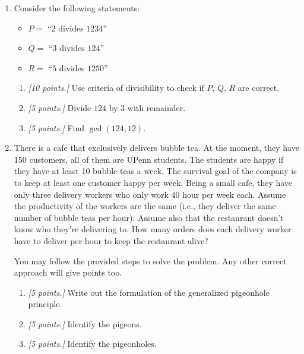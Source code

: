 \documentclass[12pt]{amsart}
\begin{document}
\begin{enumerate}[label=\arabic*.,itemsep=10pt, leftmargin=*]
    \item 
        Consider the following statements:
        \begin{itemize}
            \item $P=$ ``$2$ divides $1234$''
            \item $Q =$ ``$3$ divides $124$''
            \item $R=$ ``$5$ divides $1250$''
        \end{itemize}
        \begin{enumerate}
        \item
        \textit{[10 points.]}
        Use criteria of divisibility to check if $P$, $Q$, $R$ are correct.
        \item
        \textit{[5 points.]}
        Divide $124$ by $3$ with remainder.
        \item
        \textit{[5 points.]}
        Find $\gcd(124,12)$.
        \end{enumerate}
    \item 
        There is a cafe that exclusively delivers bubble tea.
        At the moment, they have 150 customers, all of them are UPenn students.
        The students are happy if they have at least 10 bubble teas a week.
        The survival goal of the company is to keep at least one customer happy per week.
        Being a small cafe, they have only three delivery workers who only work 40 hour per week each.
        Assume the productivity of the workers are the same (i.e., they deliver the same number of bubble teas per hour).
        Assume also that the restaurant doesn't know who they're delivering to.
        How many orders does each delivery worker have to deliver per hour to keep the restaurant alive? 
        
        You may follow the provided steps to solve the problem. Any other correct approach will give points too.
        
        \begin{enumerate}
            \item
        \textit{[5 points.]}
            Write out the formulation of the generalized pigeonhole principle.
        
            \item 
        \textit{[5 points.]}
            Identify the pigeons.

            \item 
        \textit{[5 points.]}
            Identify the pigeonholes. 


\end{enumerate}
\end{enumerate}
\end{document}
